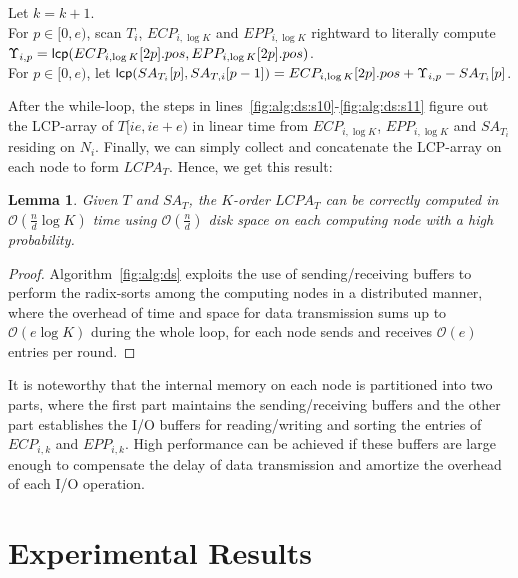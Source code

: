 \documentclass[10pt,journal,letterpaper,compsoc]{IEEEtran}
\newtheorem{Lemma}{Lemma}
\begin{document}
\begin{CJK*}{GBK}{song}
\begin{algorithm}[t!]
{{Let $k=k+1$. \\
}
For $p\in [0,e)$, scan $T_i$, $ECP_{i,\log K}$ and $EPP_{i,\log K}$ rightward to literally compute $\Upsilon_{i,p}={\sf lcp}(ECP_{i,\log K}[2p].pos,EPP_{i,\log K}[2p].pos)$. \label{fig:alg:ds:s10}\\
For $p\in [0,e)$, let ${\sf lcp}(SA_{T_i}[p],SA_{T,i}[p-1])=ECP_{i,\log K}[2p].pos + \Upsilon_{i,p} - SA_{T_i}[p]$. \label{fig:alg:ds:s11}\\
}
\end{algorithm}


After the while-loop, the steps in lines~\ref{fig:alg:ds:s10}-\ref{fig:alg:ds:s11} figure out the LCP-array of $T[ie,ie+e)$ in linear time from $ECP_{i,{\log K}}$, $EPP_{i,{\log K}}$ and $SA_{T_i}$ residing on $N_i$. Finally, we can simply collect and concatenate the LCP-array on each node to form $LCPA_T$. Hence, we get this result:

\begin{Lemma}
\label{thm:lcp:pdm}
Given $T$ and $SA_T$, the $K$-order $LCPA_T$ can be correctly computed in $\mathcal{O}(\frac{n}{d}\log K)$ time using $\mathcal{O}(\frac{n}{d})$ disk space on each computing node with a high probability.
\end{Lemma}

\begin{proof}
Algorithm~\ref{fig:alg:ds} exploits the use of sending/receiving buffers to perform the radix-sorts among the computing nodes in a distributed manner, where the overhead of time and space for data transmission sums up to $\mathcal{O}(e\log K)$ during the whole loop, for each node sends and receives $\mathcal{O}(e)$ entries per round.
\end{proof}

It is noteworthy that the internal memory on each node is partitioned into two parts, where the first part maintains the sending/receiving buffers and the other part establishes the I/O buffers for reading/writing and sorting the entries of $ECP_{i,k}$ and $EPP_{i,k}$. High performance can be achieved if these buffers are large enough to compensate the delay of data transmission and amortize the overhead of each I/O operation.

\section{Experimental Results}\label{sec:experimental_results}


\end{CJK*}
\end{document}
